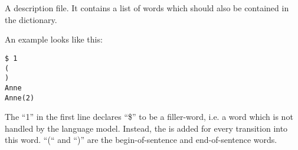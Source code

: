 
\section{}

A  description file. It contains a list of words which
should also be contained in the dictionary.

An example looks like this:

\begin{verbatim}
$ 1
(
)
Anne
Anne(2)
\end{verbatim}

The ``1'' in the first line declares ``\$'' to be a filler-word, i.e. 
a word which is not handled by the language model. Instead, the 
is added for every transition into this word. ``(`` and ``)'' are the begin-of-sentence
and end-of-sentence words.

